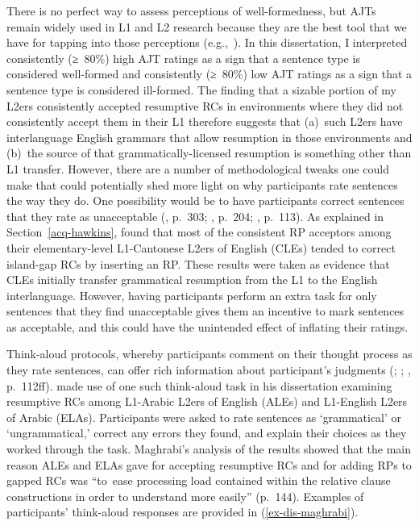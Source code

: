 There is no perfect way to assess perceptions of well-formedness, but AJTs remain widely used in L1 and L2 research because they are the best tool that we have for tapping into those perceptions (e.g.,~\cite{sprouse2018}). In this dissertation, I interpreted consistently (≥~80\%) high AJT ratings as a sign that a sentence type is considered well-formed and consistently (≥~80\%) low AJT ratings as a sign that a sentence type is considered ill-formed. The finding that a sizable portion of my L2ers consistently accepted resumptive RCs in environments where they did not consistently accept them in their L1 therefore suggests that (a)~such L2ers have interlanguage English grammars that allow resumption in those environments and (b)~the source of that grammatically-licensed resumption is something other than L1 transfer. However, there are a number of methodological tweaks one could make that could potentially shed more light on why participants rate sentences the way they do. One possibility would be to have participants correct sentences that they rate as unacceptable (\cite{devilliers.devilliers1972}, p.~303; \cite{hawkins.chan1997}, p.~204; \cite{maghrabi1997}, p.~113). As explained in Section~\ref{acq-hawkins}, \textcite{hawkins.chan1997} found that most of the consistent RP acceptors among their elementary-level L1-Cantonese L2ers of English (CLEs) tended to correct island-gap RCs by inserting an RP. These results were taken as evidence that CLEs initially transfer grammatical resumption from the L1 to the English interlanguage. However, having participants perform an extra task for only sentences that they find unacceptable gives them an incentive to mark sentences as acceptable, and this could have the unintended effect of inflating their ratings.

Think-aloud protocols, whereby participants comment on their thought process as they rate sentences, can offer rich information about participant's judgments (\cite{davies.kaplan1998}; \cite{ericsson.simon1980}; \cite{maghrabi1997}, p.~112ff). \textcite{maghrabi1997} made use of one such think-aloud task in his dissertation examining resumptive RCs among L1-Arabic L2ers of English (ALEs) and L1-English L2ers of Arabic (ELAs). Participants were asked to rate sentences as `grammatical' or `ungrammatical,' correct any errors they found, and explain their choices as they worked through the task. Maghrabi's analysis of the results showed that the main reason ALEs and ELAs gave for accepting resumptive RCs and for adding RPs to gapped RCs was ``to~ease processing load contained within the relative clause constructions in order to understand more easily'' (p.~144). Examples of participants' think-aloud responses are provided in (\ref{ex-dis-maghrabi}).

